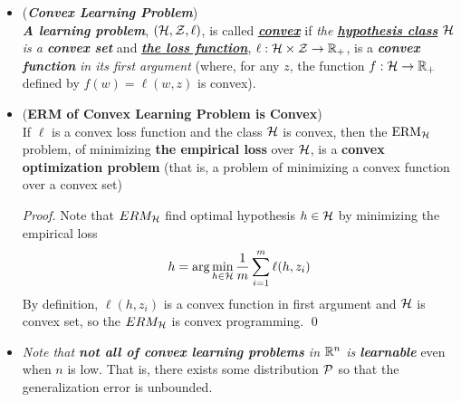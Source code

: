 \documentclass[11pt]{article}
\begin{document}
\begin{itemize}
\item \begin{definition}(\textbf{\emph{Convex Learning Problem}})\\
\emph{\textbf{A learning problem}},  $({\mathcal H}, {\mathcal Z}, \ell)$, is called \underline{\textbf{\emph{convex}}} if \emph{the \underline{\textbf{hypothesis class}} ${\mathcal H}$ is a \textbf{convex set}} and  \underline{\emph{\textbf{the loss function}}}, $\ell: {\mathcal H} \times {\mathcal Z} \to {\mathbb R}_{+}$, is a \textbf{\emph{convex function}} \emph{in its first argument} (where, for any $z$,  the function $f: {\mathcal H} \to {\mathbb R}_{+}$ defined by $f(w) = \ell(w,z)$ is convex).
\end{definition}

\item \begin{lemma} (\textbf{ERM of Convex Learning Problem is Convex}) \citep{shalev2014understanding}\\
If $\ell$ is a convex loss function and the class ${\mathcal H}$ is convex, then the $\text{ERM}_{{\mathcal H}}$ problem, of minimizing \textbf{the empirical loss} over ${\mathcal H}$, is a \textbf{convex optimization problem} (that is, a problem of minimizing a convex function over a convex set)
\end{lemma}
\begin{proof}
Note that $ERM_{{\mathcal H}}$ find optimal hypothesis $h \in {\mathcal H}$ by minimizing the empirical loss
\begin{align*}
h = \arg\min_{h \in {\mathcal H}}\frac{1}{m}\sum_{i=1}^{m}\ell(h, z_i)
\end{align*} By definition, $\ell(h, z_i)$ is a  convex function in first argument and ${\mathcal H}$ is convex set, so the $ERM_{{\mathcal H}}$ is convex programming. \qed
\end{proof}

\item \begin{remark}
\emph{Note that \textbf{not all of convex learning problems} in ${\mathbb R}^n$ is \textbf{learnable}} even when $n$ is low. That is, there exists some distribution ${\mathcal P}$ so that the generalization error is unbounded.
\end{remark}


\end{itemize}
\end{document}
